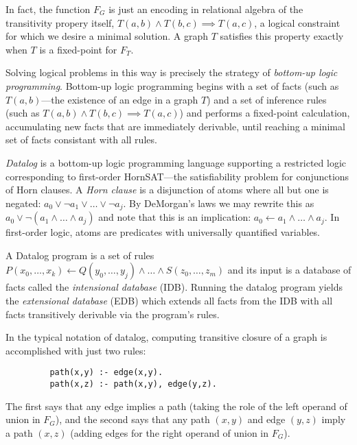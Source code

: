 In fact, the function $F_G$ is just an encoding in relational algebra of the transitivity propery itself, $T(a,b) \wedge T(b,c) \implies T(a,c)$, a logical constraint for which we desire a minimal solution. A graph $T$ satisfies this property exactly when $T$ is a fixed-point for $F_T$.

Solving logical problems in this way is precisely the strategy of \emph{bottom-up logic programming}. Bottom-up logic programming begins with a set of facts (such as $T(a,b)$---the existence of an edge in a graph $T$) and a set of inference rules (such as $T(a,b) \wedge T(b,c) \implies T(a,c)$) and performs a fixed-point calculation, accumulating new facts that are immediately derivable, until reaching a minimal set of facts consistant with all rules.

\emph{Datalog} is a bottom-up logic programming language supporting a restricted logic corresponding to first-order HornSAT---the satisfiability problem for conjunctions of Horn clauses. A \emph{Horn clause} is a disjunction of atoms where all but one is negated: $a_0 \vee \neg a_1 \vee \ldots \vee \neg a_j$. By DeMorgan's laws we may rewrite this as $a_0 \vee \neg (a_1 \wedge \ldots \wedge a_j)$ and note that this is an implication: $a_0 \leftarrow a_1 \wedge \ldots \wedge a_j$. In first-order logic, atoms are predicates with universally quantified variables.

A Datalog program is a set of rules $P(x_0,\ldots,x_k) \leftarrow Q(y_0,\ldots,y_j) \wedge \ldots \wedge S(z_0,\ldots,z_m)$ and its input is a database of facts called the \emph{intensional database} (IDB). Running the datalog program yields the \emph{extensional database} (EDB) which extends all facts from the IDB with all facts transitively derivable via the program's rules.

In the typical notation of datalog, computing transitive closure of a graph is accomplished with just two rules:

\begin{verbatim}
         path(x,y) :- edge(x,y).
         path(x,z) :- path(x,y), edge(y,z).
\end{verbatim}

The first says that any edge implies a path (taking the role of the left operand of union in $F_G$), and the second says that any path $(x,y)$ and edge $(y,z)$ imply a path $(x,z)$ (adding edges for the right operand of union in $F_G$).

